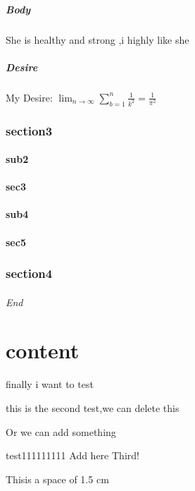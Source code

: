 \documentclass[11pt,a4paper,twoside]{article}
\begin{document}
\subsubsection{Body}
She is healthy and strong ,i highly like she
\subsubsection{Desire}
My Desire:
$
\lim_{n \to \infty}
\sum_{b=1}^{n} \frac{1}{k^2}
=\frac{1}{\pi^2}
$
\section{section3}
\subsection{sub2}
\subsection{sec3}
\subsection{sub4}
\subsection{sec5}
\section{section4}
\paragraph{End}
\part{content}
finally\newpage
i want to test



\setlength{\leftskip}{20pt}
this is the second test,we can delete this

Or we can add something


test111111111
\large Add here Third!




This\hspace{2cm}is a space of 1.5 cm
\end{document}
